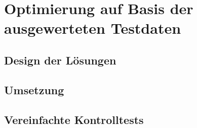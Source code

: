 \chapter{Optimierung auf Basis der ausgewerteten Testdaten}
\section{Design der Lösungen} \label{sec:optiDesign}

\section{Umsetzung} \label{sec:optiImplementation}

\section{Vereinfachte Kontrolltests} \label{sec:optiQuality}
